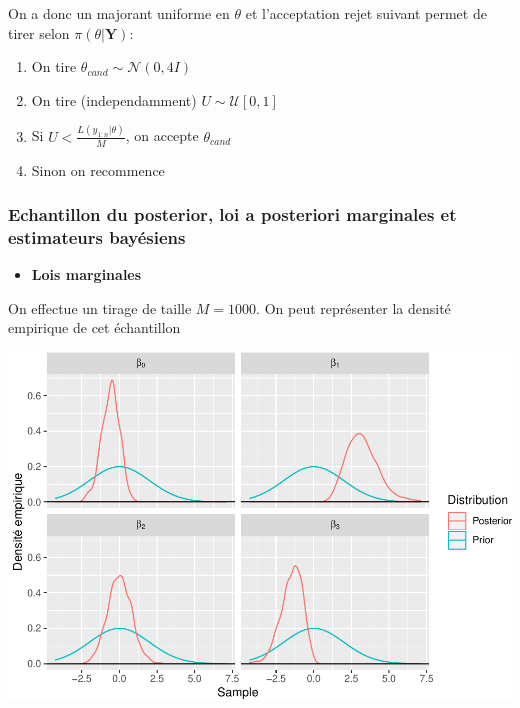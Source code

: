 \documentclass[]{article}
\providecommand{\tightlist}{%
  \setlength{\itemsep}{0pt}\setlength{\parskip}{0pt}}
\begin{document}
On a donc un majorant uniforme en \(\theta\) et l'acceptation rejet
suivant permet de tirer selon \(\pi(\theta \vert \mathbf{Y})\):

\begin{enumerate}
\def\labelenumi{\arabic{enumi}.}
\tightlist
\item
  On tire \(\theta_{cand} \sim \mathcal{N}(0, 4I)\)
\item
  On tire (independamment) \(U\sim \mathcal{U}[0, 1]\)
\item
  Si \(U < \frac{L(y_{1:n}\vert \theta)}{M}\), on accepte
  \(\theta_{cand}\)
\item
  Sinon on recommence
\end{enumerate}

\hypertarget{echantillon-du-posterior-loi-a-posteriori-marginales-et-estimateurs-bayuxe9siens}{%
\subsubsection{Echantillon du posterior, loi a posteriori marginales et
estimateurs
bayésiens}\label{echantillon-du-posterior-loi-a-posteriori-marginales-et-estimateurs-bayuxe9siens}}

\begin{itemize}
\tightlist
\item
  \textbf{Lois marginales}
\end{itemize}

On effectue un tirage de taille \(M = 1000\). On peut représenter la
densité empirique de cet échantillon

\includegraphics{poly_cours_files/figure-latex/plot_posterior_samples-1.pdf}
\end{document}
